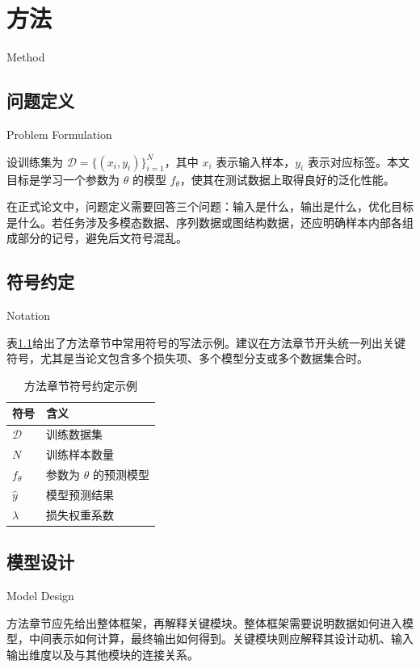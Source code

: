 \chapter{方法}{Method}

\section{问题定义}{Problem Formulation}

设训练集为 $\mathcal{D}=\{(x_i,y_i)\}_{i=1}^{N}$，其中 $x_i$ 表示输入样本，$y_i$ 表示对应标签。本文目标是学习一个参数为 $\theta$ 的模型 $f_\theta$，使其在测试数据上取得良好的泛化性能。

在正式论文中，问题定义需要回答三个问题：输入是什么，输出是什么，优化目标是什么。若任务涉及多模态数据、序列数据或图结构数据，还应明确样本内部各组成部分的记号，避免后文符号混乱。

\section{符号约定}{Notation}

表\ref{tab:method-notation}给出了方法章节中常用符号的写法示例。建议在方法章节开头统一列出关键符号，尤其是当论文包含多个损失项、多个模型分支或多个数据集合时。

\begin{table}[htbp]
    \centering
    \caption{方法章节符号约定示例}
    \label{tab:method-notation}
    \begin{tabular}{ll}
        \toprule
        符号 & 含义 \\
        \midrule
        $\mathcal{D}$ & 训练数据集 \\
        $N$ & 训练样本数量 \\
        $f_\theta$ & 参数为 $\theta$ 的预测模型 \\
        $\hat{y}$ & 模型预测结果 \\
        $\lambda$ & 损失权重系数 \\
        \bottomrule
    \end{tabular}
\end{table}

\section{模型设计}{Model Design}

方法章节应先给出整体框架，再解释关键模块。整体框架需要说明数据如何进入模型，中间表示如何计算，最终输出如何得到。关键模块则应解释其设计动机、输入输出维度以及与其他模块的连接关系。

